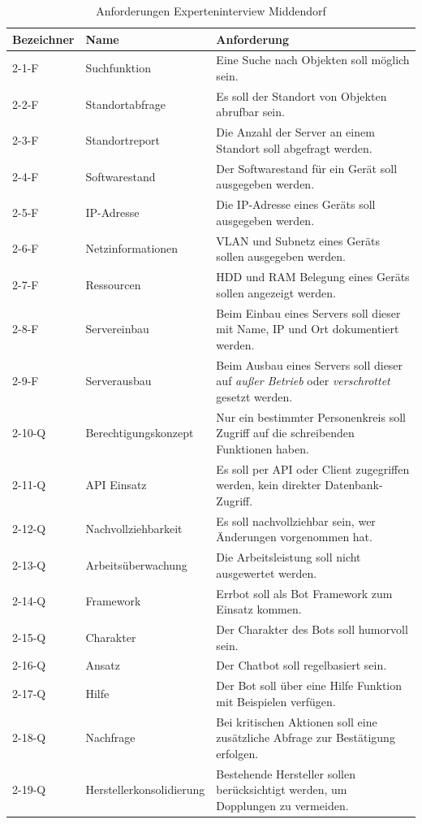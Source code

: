 \begin{table}[H]
\centering
\begin{tabularx}{1\textwidth}{l|l|X}
  Bezeichner & Name                 & Anforderung \\\hline
  2-1-F  & Suchfunktion             & Eine Suche nach Objekten soll möglich sein. \\
  2-2-F  & Standortabfrage          & Es soll der Standort von Objekten abrufbar sein. \\
  2-3-F  & Standortreport           & Die Anzahl der Server an einem Standort soll abgefragt werden. \\
  2-4-F  & Softwarestand            & Der Softwarestand für ein Gerät soll ausgegeben werden. \\
  2-5-F  & IP-Adresse               & Die IP-Adresse eines Geräts soll ausgegeben werden. \\
  2-6-F  & Netzinformationen        & VLAN und Subnetz eines Geräts sollen ausgegeben werden. \\
  2-7-F  & Ressourcen               & HDD und RAM Belegung eines Geräts sollen angezeigt werden. \\
  2-8-F  & Servereinbau             & Beim Einbau eines Servers soll dieser mit Name, IP und Ort dokumentiert werden. \\
  2-9-F  & Serverausbau             & Beim Ausbau eines Servers soll dieser auf \textit{außer Betrieb} oder \textit{verschrottet} gesetzt werden. \\
  2-10-Q & Berechtigungskonzept     & Nur ein bestimmter Personenkreis soll Zugriff auf die schreibenden Funktionen haben. \\
  2-11-Q & API Einsatz              & Es soll per API oder Client zugegriffen werden, kein direkter Datenbank-Zugriff.\\
  2-12-Q & Nachvollziehbarkeit      & Es soll nachvollziehbar sein, wer Änderungen vorgenommen hat. \\
  2-13-Q & Arbeitsüberwachung      & Die Arbeitsleistung soll nicht ausgewertet werden. \\
  2-14-Q & Framework                & Errbot soll als Bot Framework zum Einsatz kommen. \\
  2-15-Q & Charakter                & Der Charakter des Bots soll humorvoll sein. \\
  2-16-Q & Ansatz                   & Der Chatbot soll regelbasiert sein. \\
  2-17-Q & Hilfe                    & Der Bot soll über eine Hilfe Funktion mit Beispielen verfügen. \\
  2-18-Q & Nachfrage                & Bei kritischen Aktionen soll eine zusätzliche Abfrage zur Bestätigung erfolgen. \\
  2-19-Q & Herstellerkonsolidierung & Bestehende Hersteller sollen berücksichtigt werden, um Dopplungen zu vermeiden. \\
\end{tabularx}
\\\eigen
\caption{Anforderungen Experteninterview Middendorf}
\label{tab:expmidd}
\end{table}

